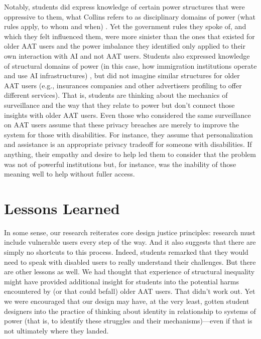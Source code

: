 \documentclass[11pt,dvipdfm]{article}
\begin{document}
Notably, students did express knowledge of certain power structures that were oppressive to them, what Collins refers to as disciplinary domains of power (what rules apply, to whom and when) \cite{7}. Yet the government rules they spoke of, and which they felt influenced them, were more sinister than the ones that existed for older AAT users and the power imbalance they identified only applied to their own interaction with AI and not AAT users. Students also expressed knowledge of structural domains of power (in this case, how immigration institutions operate and use AI infrastructures) \cite{7}, but did not imagine similar structures for older AAT users (e.g., insurances companies and other advertisers profiling to offer different services). That is, students are thinking about the mechanics of surveillance and the way that they relate to power but don’t connect those insights with older AAT users. Even those who considered the same surveillance on AAT users assume that these privacy breaches are merely to improve the system for those with disabilities. For instance, they assume that personalization and assistance is an appropriate privacy tradeoff for someone with disabilities. If anything, their empathy and desire to help led them to consider that the problem was not of powerful institutions but, for instance, was the inability of those meaning well to help without fuller access.

\section{Lessons Learned}
In some sense, our research reiterates core design justice principles: research must include vulnerable users every step of the way. And it also suggests that there are simply no shortcuts to this process. Indeed, students remarked that they would need to speak with disabled users to really understand their challenges. But there are other lessons as well. We had thought that experience of structural inequality might have provided additional insight for students into the potential harms encountered by (or that could befall) older AAT users. That didn’t work out. Yet we were encouraged that our design may have, at the very least, gotten student designers into the practice of thinking about identity in relationship to systems of power (that is, to identify these struggles and their mechanisms)—even if that is not ultimately where they landed. 
\end{document}
